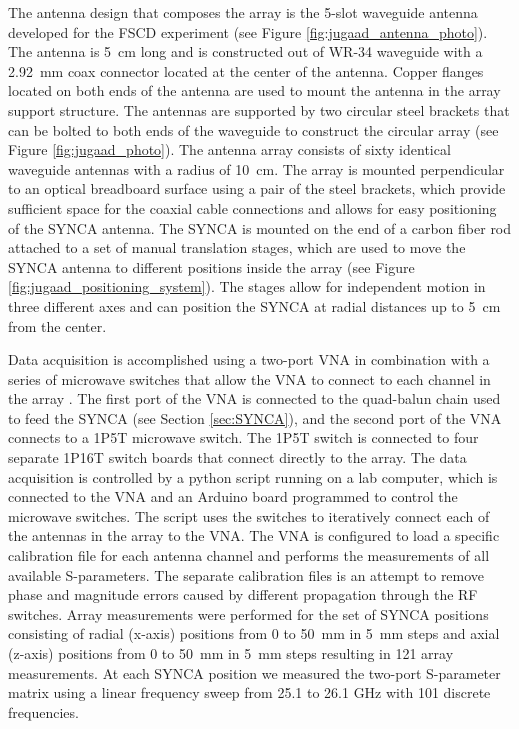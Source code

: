 The antenna design that composes the array is the 5-slot waveguide antenna developed for the FSCD experiment (see Figure \ref{fig:jugaad_antenna_photo}). The antenna is 5~cm long and is constructed out of WR-34 waveguide with a 2.92~mm coax connector located at the center of the antenna. Copper flanges located on both ends of the antenna are used to mount the antenna in the array support structure. The antennas are supported by two circular steel brackets that can be bolted to both ends of the waveguide to construct the circular array (see Figure \ref{fig:jugaad_photo}). The antenna array consists of sixty identical waveguide antennas with a radius of 10~cm. The array  is mounted perpendicular to an optical breadboard surface using a pair of the steel brackets, which provide sufficient space for the coaxial cable connections and allows for easy positioning of the SYNCA antenna. The SYNCA is mounted on the end of a carbon fiber rod attached to a set of manual translation stages, which are used to move the SYNCA antenna to different positions inside the array (see Figure \ref{fig:jugaad_positioning_system}). The stages allow for independent motion in three different axes and can position the SYNCA at radial distances up to 5~cm from the center.

Data acquisition is accomplished using a two-port VNA in combination with a series of microwave switches that allow the VNA to connect to each channel in the array .  The first port of the VNA is connected to the quad-balun chain used to feed the SYNCA (see Section \ref{sec:SYNCA}), and the second port of the VNA connects to a 1P5T microwave switch. The 1P5T switch is connected to four separate 1P16T switch boards that connect directly to the array. The data acquisition is controlled by a python script running on a lab computer, which is connected to the VNA and an Arduino board programmed to control the microwave switches. The script uses the switches to iteratively connect each of the antennas in the array to the VNA. The VNA is configured to load a specific calibration file for each antenna channel and performs the measurements of all available S-parameters. The separate calibration files is an attempt to remove phase and magnitude errors caused by different propagation through the RF switches. Array measurements were performed for the set of SYNCA positions consisting of radial (x-axis) positions from 0 to 50~mm in 5~mm steps and axial (z-axis) positions from 0 to 50~mm in 5~mm steps resulting in 121 array measurements. At each SYNCA position we measured the two-port S-parameter matrix using a linear frequency sweep from 25.1 to 26.1 GHz with 101 discrete frequencies.

